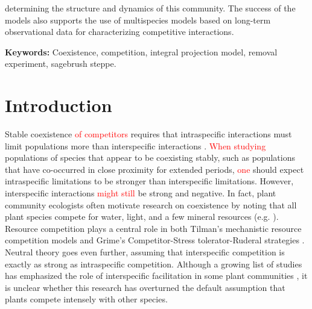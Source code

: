\documentclass[11pt]{article}
\newcommand{\new}{\textcolor{red}}
\begin{document}
\begin{doublespacing}
determining the structure and dynamics of this community. The success of the models also supports the use of multispecies models based on long-term observational data for characterizing competitive interactions. 

\textbf{\large{Keywords:}} Coexistence, competition, integral projection model, removal experiment, sagebrush steppe. 

\section*{Introduction}

Stable coexistence \new{of competitors} requires that intraspecific interactions must limit populations more than interspecific interactions \citep{chesson_mechanisms_2000}. \new{When studying} populations of species that appear to be coexisting stably, such as populations that have co-occurred in close proximity for extended periods, \new{one} should expect intraspecific limitations to be stronger than interspecific limitations. However, interspecific interactions \new{might still} be strong and negative. In fact, plant community ecologists often motivate research on coexistence by noting that all plant species compete for water, light, and a few mineral resources (e.g. \citealt{silvertown_plant_2004}). Resource competition plays a central role in both Tilman's mechanistic resource competition models \citep{tilman_resource_1982} and Grime's Competitor-Stress tolerator-Ruderal strategies \citep{grime_plant_1979}. Neutral theory \citep{hubbell_unified_2001} goes even further, assuming that interspecific competition is exactly as strong as intraspecific competition. Although a growing list of studies has emphasized the role of interspecific facilitation in some plant communities \citep{brooker_facilitation_2008,he_global_2013}, it is unclear whether this research has overturned the default assumption that plants compete intensely with other species.


\end{doublespacing}
\end{document}
